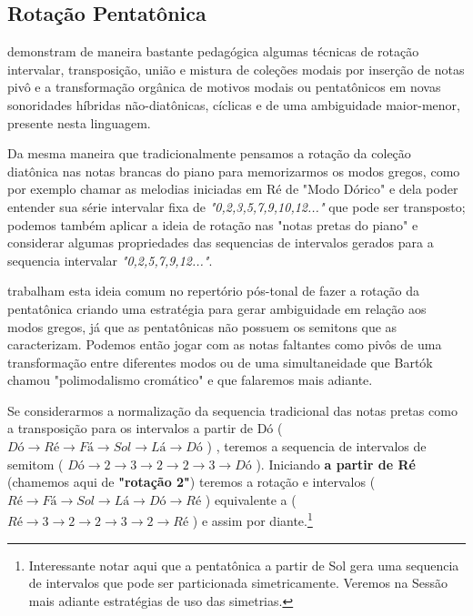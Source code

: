 \documentclass[
	12pt,				%
	openright,			%
	twoside,			%
	a4paper,			%
	english,			%
	french,				%
	spanish,			%
	brazil				%
	]{abntex2}
\begin{document}
\subsection{Rotação Pentatônica}
\label{pentarota}
 
 demonstram de maneira bastante pedagógica algumas técnicas de rotação intervalar, transposição, união e mistura de coleções modais por inserção de notas pivô e a transformação orgânica de motivos modais ou pentatônicos em novas sonoridades híbridas não-diatônicas, cíclicas e de uma ambiguidade maior-menor, presente nesta linguagem. 

Da mesma maneira que tradicionalmente pensamos a rotação da coleção diatônica nas notas brancas do piano para memorizarmos os modos gregos, como por exemplo chamar as melodias iniciadas em Ré de "Modo Dórico" e dela poder entender sua série intervalar fixa de \textit{"0,2,3,5,7,9,10,12..."} que pode ser transposto; podemos também aplicar a ideia de rotação nas "notas pretas do piano" e considerar algumas propriedades das sequencias de intervalos gerados para a sequencia intervalar \textit{"0,2,5,7,9,12..."}.

 trabalham esta ideia comum no repertório pós-tonal de fazer a rotação da pentatônica criando uma estratégia para gerar ambiguidade em relação aos modos gregos, já que as pentatônicas não possuem os semitons que as caracterizam. Podemos então jogar com as notas faltantes como pivôs de uma transformação entre diferentes modos ou de uma simultaneidade que Bartók chamou "polimodalismo cromático" e que falaremos mais adiante. 

Se considerarmos a normalização da sequencia tradicional das notas pretas como a transposição para os intervalos a partir de Dó ( $Dó \rightarrow  Ré \rightarrow Fá \rightarrow Sol \rightarrow Lá \rightarrow Dó $ ) , teremos a sequencia de intervalos de semitom ( $Dó \rightarrow 2 \rightarrow  3 \rightarrow 2 \rightarrow 2  \rightarrow 3 \rightarrow Dó $ ). Iniciando \textbf{a partir de Ré} (chamemos aqui de \textbf{"rotação 2"}) teremos a rotação e intervalos ($Ré \rightarrow Fá \rightarrow Sol \rightarrow Lá \rightarrow Dó \rightarrow Ré $ ) equivalente a ( $  Ré \rightarrow 3 \rightarrow  2 \rightarrow 2 \rightarrow 3  \rightarrow 2 \rightarrow Ré $ ) e assim por diante.\footnote{Interessante notar aqui que a pentatônica a partir de Sol gera uma sequencia de intervalos que pode ser particionada simetricamente. Veremos na Sessão mais adiante estratégias de uso das simetrias.}
\end{document}

